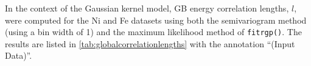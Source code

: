 \documentclass[final,twocolumn,12pt]{elsarticle}
\begin{document}
    In the context of the Gaussian kernel model, GB energy correlation lengths, $l$, were computed for the Ni and Fe datasets using both the semivariogram method (using a bin width of \SI{1}{\tobydeg}) and the maximum likelihood method of \texttt{fitrgp()}. The results are listed in \cref{tab:globalcorrelationlengths} with the annotation ``(Input Data)''.
	
	
	
\end{document}
